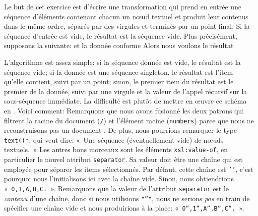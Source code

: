 \label{par:CSV}

Le but de cet exercice est d'écrire une transformation \XSLT qui prend
en entrée une séquence d'éléments contenant chacun un nœud textuel
et produit leur contenus dans le même ordre, séparés par des virgules
et terminés par un point final. Si la séquence d'entrée est vide, le
résultat est la séquence vide. Plus précisément, supposons la \DTD suivante:
\noindent et la donnée conforme
\noindent Alors nous voulons le résultat

L'algorithme est assez simple: si la séquence donnée est vide, le
résultat est la séquence vide; si la donnée est une séquence
singleton, le résultat est l'item qu'elle contient, suivi par un
point; sinon, le premier item du résultat est le premier de la donnée,
suivi par une virgule et la valeur de l'appel récursif sur la
sous-séquence immédiate. La difficulté est plutôt de mettre en
œuvre ce schéma en \XSLT. Voici comment:
\noindent Remarquons que nous avons fusionné les deux patrons qui
filtrent la racine du document (\texttt{/}) et l'élément racine
(\texttt{numbers}) parce que nous ne reconstruisons pas un document
\XML. De plus, nous pourrions remarquer le type \texttt{text()*}, qui
veut dire: «~Une séquence (éventuellement vide) de nœuds textuels.~»
Les autres bons morceaux sont les éléments \texttt{xsl:value-of}, en
particulier le nouvel attribut \texttt{separator}. Sa valeur doit être
une chaîne qui est employée pour séparer les items sélectionnés. Par
défaut, cette chaîne est \texttt{'\textvisiblespace'}, c'est pourquoi
nous l'initialisons ici avec la chaîne vide. Sinon, nous obtiendrions
«~\texttt{0\textvisiblespace,1\textvisiblespace,A\textvisiblespace,B\textvisiblespace,C\textvisiblespace.}~». Remarquons
que la valeur de l'attribut \texttt{separator} est le \emph{contenu}
d'une chaîne, donc si nous utilisions \texttt{"''"}, nous ne serions
\emph{pas} en train de spécifier une chaîne vide et nous produirions à
la place: «~\texttt{0'',1'',A'',B'',C''.}~».

